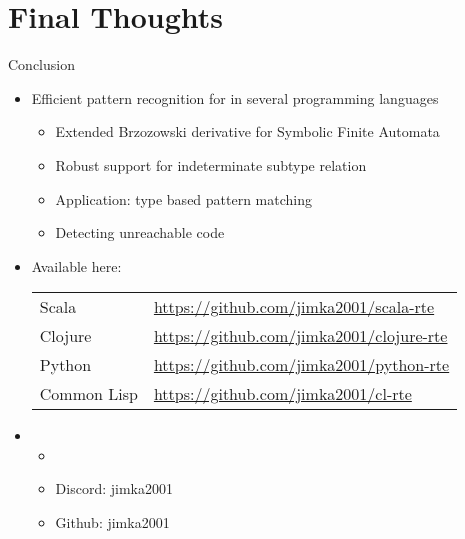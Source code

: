 \section{Final Thoughts}


{
\begin{frame}{Conclusion}
  \begin{itemize}
  \item Efficient pattern recognition for  in several programming languages
    \begin{itemize}
    \item Extended Brzozowski derivative for Symbolic Finite Automata
    \item Robust support for indeterminate subtype relation
    \item Application: type based pattern matching
    \item Detecting unreachable code
    \end{itemize}
  \item Available here:
    \begin{tabular}{ll}
    Scala & \url{https://github.com/jimka2001/scala-rte}\\
    Clojure & \url{https://github.com/jimka2001/clojure-rte}\\
    Python & \url{https://github.com/jimka2001/python-rte}\\
    Common Lisp & \url{https://github.com/jimka2001/cl-rte}    
  \end{tabular}
  \item {}

    \begin{itemize}
    \item {}
    \item Discord: jimka2001
    \item Github: jimka2001
      
    \end{itemize}
  \end{itemize}
\end{frame}

}
